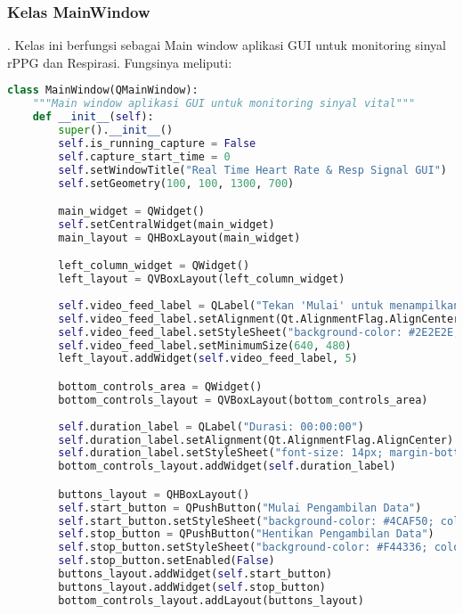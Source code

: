 \documentclass[11pt,a4paper]{article}
\begin{document}
\subsubsection{Kelas MainWindow}.
     Kelas ini berfungsi sebagai Main window aplikasi GUI untuk monitoring sinyal rPPG dan Respirasi. Fungsinya meliputi:
    \begin{lstlisting}[language=Python, caption=Kelas RealTimeSignalWorker,label={labelkode}]
    class MainWindow(QMainWindow):
    """Main window aplikasi GUI untuk monitoring sinyal vital"""
    def __init__(self):
        super().__init__()
        self.is_running_capture = False 
        self.capture_start_time = 0 
        self.setWindowTitle("Real Time Heart Rate & Resp Signal GUI")
        self.setGeometry(100, 100, 1300, 700) 

        main_widget = QWidget()
        self.setCentralWidget(main_widget)
        main_layout = QHBoxLayout(main_widget)

        left_column_widget = QWidget()
        left_layout = QVBoxLayout(left_column_widget)
        
        self.video_feed_label = QLabel("Tekan 'Mulai' untuk menampilkan video feed")
        self.video_feed_label.setAlignment(Qt.AlignmentFlag.AlignCenter)
        self.video_feed_label.setStyleSheet("background-color: #2E2E2E; color: white; font-size: 16px; border: 1px solid #555;")
        self.video_feed_label.setMinimumSize(640, 480) 
        left_layout.addWidget(self.video_feed_label, 5) 

        bottom_controls_area = QWidget()
        bottom_controls_layout = QVBoxLayout(bottom_controls_area)
        
        self.duration_label = QLabel("Durasi: 00:00:00") 
        self.duration_label.setAlignment(Qt.AlignmentFlag.AlignCenter)
        self.duration_label.setStyleSheet("font-size: 14px; margin-bottom: 5px;")
        bottom_controls_layout.addWidget(self.duration_label)

        buttons_layout = QHBoxLayout() 
        self.start_button = QPushButton("Mulai Pengambilan Data")
        self.start_button.setStyleSheet("background-color: #4CAF50; color: white; padding: 8px; font-size:14px;")
        self.stop_button = QPushButton("Hentikan Pengambilan Data")
        self.stop_button.setStyleSheet("background-color: #F44336; color: white; padding: 8px; font-size:14px;")
        self.stop_button.setEnabled(False)
        buttons_layout.addWidget(self.start_button)
        buttons_layout.addWidget(self.stop_button)
        bottom_controls_layout.addLayout(buttons_layout)
        

\end{lstlisting}
\end{document}
